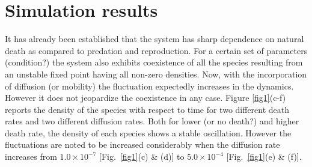 \documentclass[aps, pre, twocolumn, amsmath, superscriptaddress,showkeys,showpacs]{revtex4-1}
\begin{document}
\section{Simulation results}
\label{results}
{\color{red} It has already been established \cite{bhattacharyya2020mortality} that the system has sharp dependence on natural death as compared to predation and reproduction. For a certain set of parameters {\color{blue}(condition?)} the system also exhibits coexistence of all the species resulting from an unstable fixed point having all non-zero densities. Now, with the incorporation of diffusion (or mobility) the fluctuation expectedly increases in the dynamics. However it does not jeopardize the coexistence in any case. Figure \ref{fig1}(c-f) reports the density of the species with respect to time for two different death rates and two different diffusion rates. Both for lower {\color{blue} (or no death?)} and higher death rate, the density of each species shows a stable oscillation. However the fluctuations are noted to be increased considerably when the diffusion rate increases from $1.0\times10^{-7}$ [Fig.~\ref{fig1}(c) \& (d)] to $5.0\times10^{-4}$ [Fig.~\ref{fig1}(e) \& (f)].}
\end{document}
